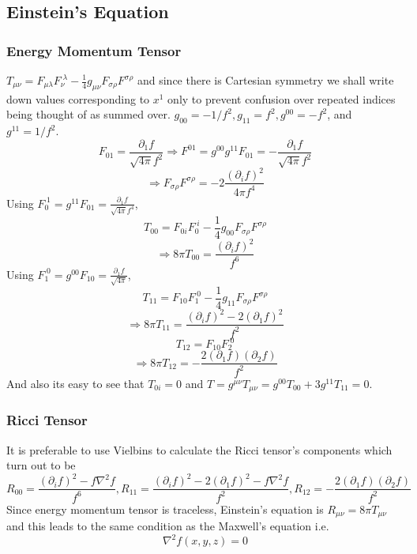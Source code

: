 ﻿\documentclass[12pt,a4paper]{article}
\begin{document}
\subsection{Einstein's Equation}

\subsubsection{Energy Momentum Tensor}
$T_{\mu \nu}=F_{\mu \lambda} F_{\nu}^{\;\lambda}-\frac{1}{4} g_{\mu \nu} F_{\sigma \rho} F^{\sigma \rho}$ and since there is Cartesian symmetry we shall write down values corresponding to $x^{1}$ only to prevent confusion over repeated indices being thought of as summed over. $g_{00}=-1 / f^{2}, g_{11}=f^{2}, g^{00}=-f^{2}$, and $g^{11}=1 / f^{2}$.
$$F_{0 1} =\frac{\partial_{1} f}{\sqrt{4 \pi}f^{2}} \Rightarrow F^{01}=g^{00} g^{11} F_{01}=-\frac{\partial_{1} f}{\sqrt{4 \pi} f^{2}}$$
$$\Rightarrow F_{\sigma \rho} F^{\sigma \rho}=-2\frac{\left(\partial_{i} f\right)^{2}}{4 \pi f^{4}}$$
Using $F_{0}^{\;1}=g^{1 1} F_{0 1}=\frac{\partial_{1} f}{\sqrt{4 \pi} f^{4}}$,
$$T_{00}=F_{0 i} F_{0}^{\;i}-\frac{1}{4} g_{00} F_{\sigma \rho} F^{\sigma \rho}$$
$$
\Rightarrow 8 \pi T_{0 0}=\frac{\left(\partial_{i} f\right)^{2}}{f^{6}}
$$
Using $F_{1}^{\;0}=g^{0 0} F_{1 0}=\frac{\partial_{1} f}{\sqrt{4 \pi}}$,
$$T_{1 1}=F_{1 0} F_{1}^{\;0}-\frac{1}{4} g_{11} F_{\sigma \rho} F^{\sigma \rho}$$
$$
\Rightarrow 8 \pi T_{1 1}=\frac{\left(\partial_{i} f\right)^{2}-2\left(\partial_{1} f\right)^{2}}{f^{2}}
$$
$$T_{1 2}=F_{1 0} F_{2}^{\;0}$$$$\Rightarrow 8 \pi T_{1 2}=-\frac{2\left(\partial_{1} f\right)\left(\partial_{2} f\right)}{f^{2}}$$
And also its easy to see that $T_{0 i}=0$ and $T=g^{\mu \nu} T_{\mu \nu}=g^{0 0} T_{0 0} + 3 g^{1 1} T_{1 1}=0$.

\subsubsection{Ricci Tensor}
It is preferable to use Vielbins to calculate the Ricci tensor's components which turn out to be 
$$R_{00}=\frac{\left(\partial_{i} f\right)^{2}-f \nabla^{2} f}{f^{6}}, R_{11}=\frac{\left(\partial_{i} f\right)^{2}-2\left(\partial_{1} f\right)^{2}-f \nabla^{2} f}{f^{2}}, R_{12}=-\frac{2\left(\partial_{1} f\right)\left(\partial_{2} f\right)}{f^{2}}$$
Since energy momentum tensor is traceless, Einstein's equation is $R_{\mu \nu}=8 \pi T_{\mu \nu}$ and this leads to the same condition as the Maxwell's equation i.e.
$$
\nabla^{2} f(x, y, z)=0
$$
\end{document}
